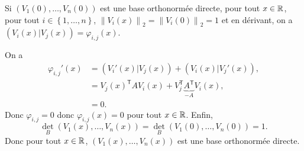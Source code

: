 \documentclass[12pt]{article}
\begin{document}
\begin{remark}
	Si $(V_1(0),\dots,V_n(0))$ est une base orthonormée directe, pour tout $x\in\mathbb{R}$, pour tout $i\in\left\lbrace1,\dots,n\right\rbrace$, $\left\lVert V_i(x)\right\rVert_{2}=\left\lVert V_i(0)\right\rVert_{2}=1$ et en dérivant, on a $(V_i(x)|V_j(x))=\varphi_{i,j}(x)$.

	On a 
	\begin{align*}
		\varphi_{i,j}'(x)
		&=(V_i'(x)|V_j(x))+(V_i(x)|V_j'(x)),\\
		&=V_j(x)^{\mathsf{T}}AV_i(x)+V_j^{\mathsf{T}}\underbrace{A^{\mathsf{T}}}_{-A}V_i(x),\\
		&=0.
	\end{align*}
	Donc $\varphi_{i,j}=0$ donc $\varphi_{i,j}(x)=0$ pour tout $x\in\mathbb{R}$. Enfin, \begin{equation*}
		\det_{B}(V_1(x),\dots,V_n(x))=\det_{B}(V_1(0),\dots,V_n(0))=1.	
	\end{equation*}
	Donc pour tout $x\in\mathbb{R}$, $(V_1(x),\dots,V_n(x))$ est une base orthonormée directe.
\end{remark}
\end{document}
